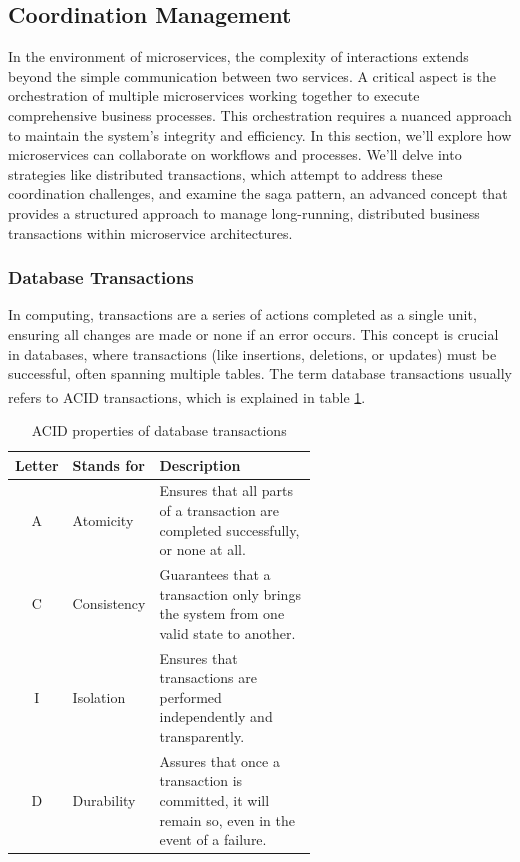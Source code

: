 \subsection{Coordination Management}
In the environment of microservices, the complexity of interactions extends beyond the simple
communication between two services. A critical aspect is the orchestration of multiple microservices
working together to execute comprehensive business processes. This orchestration requires a nuanced
approach to maintain the system's integrity and efficiency.
\newline\newline
In this section, we'll explore how microservices can collaborate on workflows and processes. We'll
delve into strategies like distributed transactions, which attempt to address these coordination
challenges, and examine the saga pattern, an advanced concept that provides a structured approach to
manage long-running, distributed business transactions within microservice architectures.

\subsubsection{Database Transactions}
In computing, transactions are a series of actions completed as a single unit, ensuring all changes
are made or none if an error occurs. This concept is crucial in databases, where transactions (like
insertions, deletions, or updates) must be successful, often spanning multiple tables. The term
database transactions usually refers to ACID transactions\textsuperscript{\cite{microservice_acid}},
which is explained in table \ref{tab:acid}.

\begin{table}
    \centering
    \begin{tabular}{|c|l|p{0.6\linewidth}|}
        \hline
        \textbf{Letter} & \textbf{Stands for} & \textbf{Description}                                                                             \\ \hline
        A               & Atomicity           & Ensures that all parts of a transaction are completed successfully, or none at all.              \\ \hline
        C               & Consistency         & Guarantees that a transaction only brings the system from one valid state to another.            \\ \hline
        I               & Isolation           & Ensures that transactions are performed independently and transparently.                         \\ \hline
        D               & Durability          & Assures that once a transaction is committed, it will remain so, even in the event of a failure. \\ \hline
    \end{tabular}
    \caption{ACID properties of database transactions}
    \label{tab:acid}
\end{table}

